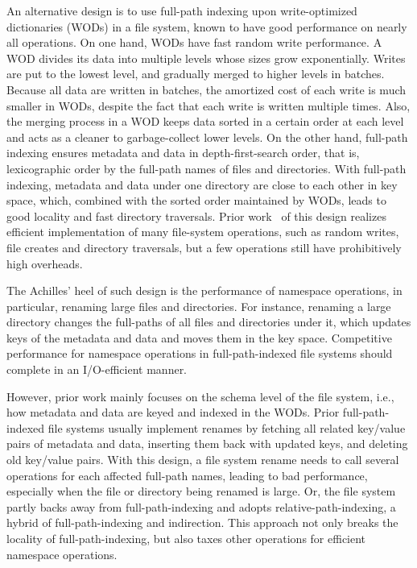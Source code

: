 An alternative design is to use full-path indexing upon write-optimized
dictionaries (WODs) in a file system, known to have good performance on nearly
all operations.
On one hand, WODs have fast random write performance.
A WOD divides its data into multiple levels whose sizes grow exponentially.
Writes are put to the lowest level, and gradually merged to higher levels in
batches.
Because all data are written in batches, the amortized cost of each write is
much smaller in WODs,
despite the fact that each write is written multiple times.
Also, the merging process in a WOD keeps data sorted in a certain order at each
level and acts as a cleaner to garbage-collect lower levels.
On the other hand, full-path indexing ensures metadata and data in
depth-first-search order, that is, lexicographic order by the full-path names
of files and directories.
With full-path indexing, metadata and data under one directory are close to each
other in key space, which, combined with the sorted order maintained by
WODs, leads to good locality and fast directory traversals.
Prior work~\citep{betrfs1,betrfs1tos,betrfs2,betrfs2tos,betrfs3} of this design
realizes efficient implementation of many file-system operations, such as random
writes, file creates and directory traversals,
but a few operations still have prohibitively high overheads.

The Achilles' heel of such design is the performance of namespace operations,
in particular, renaming large files and directories.
For instance, renaming a large directory changes the full-paths of all files
and directories under it, which updates keys of the metadata and
data and moves them in the key space.
Competitive performance for namespace operations in full-path-indexed file
systems should complete in an I/O-efficient manner.

However, prior work mainly focuses on the schema level of the file system, i.e.,
how metadata and data are keyed and indexed in the WODs.
Prior full-path-indexed file systems usually implement renames by
fetching all related key/value pairs of metadata and data,
inserting them back with updated keys, and deleting old key/value pairs.
With this design, a file system rename needs to call several operations for each
affected full-path names, leading to bad performance,
especially when the file or directory being renamed is large.
Or, the file system partly backs away from full-path-indexing and adopts
relative-path-indexing, a hybrid of full-path-indexing and indirection.
This approach not only breaks the locality of full-path-indexing, but also
taxes other operations for efficient namespace operations.

